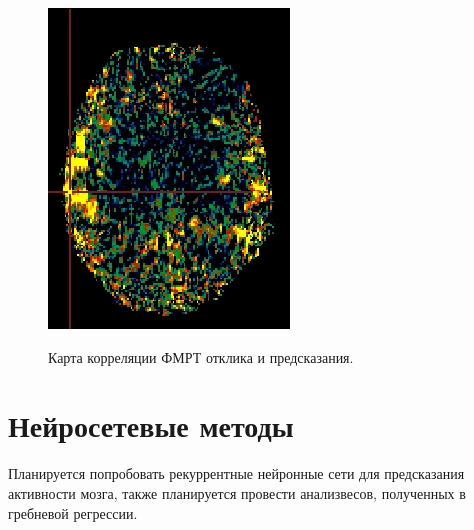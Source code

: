 \documentclass[pdftex,ptm,12pt,a4paper]{report}
\theoremstyle{definition}
\begin{document}
\begin{figure}[h]
\begin{multicols}{2}
\includegraphics[scale=0.6]{graphics/slices/sub12.png}
\label{sub3_slice}
\end{multicols}
\centering
\caption{Карта корреляции ФМРТ отклика и предсказания.}
\end{figure}


\section{Нейросетевые методы}

Планируется попробовать рекуррентные нейронные сети для предсказания активности мозга, также планируется провести анализвесов, полученных в гребневой регрессии.



\end{document}
